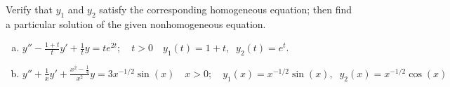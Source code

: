 \documentclass[12pt,letterpaper]{hmcpset}
\begin{document}
\begin{solution}
    \vfill
\end{solution}
\clearpage

\begin{problem}[F8]
    Verify that $y_1$ and $y_2$ satisfy the corresponding homogeneous 
    equation; then find a particular
    solution of the given nonhomogeneous equation.
    \begin{enumerate}[(a)]
        \item $y'' - \frac{1+t}{t}y' + \frac{1}{t}y=te^{2t};
            \quad t>0 \quad y_1(t)=1+t,\;\;y_2(t)=e^t$.
        \item $y''+\frac{1}{x}y' + \frac{x^2-\frac{1}{4}}{x^2}y = 3x^{-1/2}\sin(x)
            \quad x>0; \quad y_1(x)=x^{-1/2}\sin(x),\;\;y_2(x)=x^{-1/2}\cos(x)$
    \end{enumerate}
\end{problem}

\begin{solution}
    \vfill
\end{solution}
\clearpage
\end{document}
